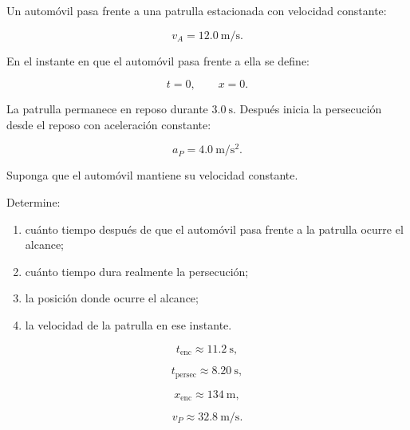 \begin{ejercicio}
Un automóvil pasa frente a una patrulla estacionada con velocidad constante:

\[ v_A=\SI{12.0}{\meter\per\second}. \]

En el instante en que el automóvil pasa frente a ella se define:

\[ t=0,\qquad x=0. \]

La patrulla permanece en reposo durante \(\SI{3.0}{\second}\). Después inicia la persecución desde el reposo con aceleración constante:

\[ a_P=\SI{4.0}{\meter\per\second\squared}. \]

Suponga que el automóvil mantiene su velocidad constante.

Determine:

\begin{enumerate}[label=\alph*)]
    \item cuánto tiempo después de que el automóvil pasa frente a la patrulla ocurre el alcance;
    \item cuánto tiempo dura realmente la persecución;
    \item la posición donde ocurre el alcance;
    \item la velocidad de la patrulla en ese instante.
\end{enumerate}
\end{ejercicio}

\begin{respuesta}
\[
t_{\mathrm{enc}}\approx\SI{11.2}{\second},
\]

\[
t_{\mathrm{persec}}\approx\SI{8.20}{\second},
\]

\[
x_{\mathrm{enc}}\approx\SI{134}{\meter},
\]

\[
v_P\approx\SI{32.8}{\meter\per\second}.
\]
\end{respuesta}

